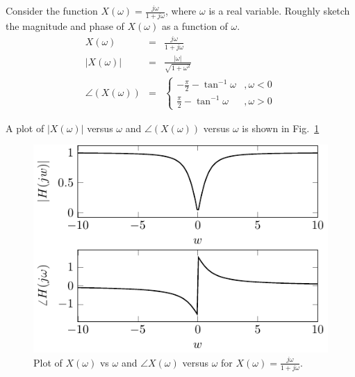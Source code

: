 \begin{example} Consider the function $X(\omega) = \frac{j \omega}{1+j\omega}$, where $\omega$ is a real variable.  Roughly sketch the magnitude and phase of $X(\omega)$ as a function of $\omega$.
\begin{eqnarray}
\nonumber X(\omega) &=& \frac{j\omega}{1+j\omega}\\
\nonumber |X(\omega)| &=& \frac{|\omega|}{\sqrt{1+\omega^2}}\\
\nonumber \angle(X(\omega)) &=& \left\{\begin{array}{ll}
-\frac{\pi}{2}-\tan^{-1}\omega &,\omega <0 \\
\frac{\pi}{2}-\tan^{-1}\omega &,\omega >0\end{array}
\right.
\end{eqnarray}

A plot of $|X(\omega)|$ versus $\omega$ and $\angle(X(\omega))$ versus $\omega$ is shown in Fig.~\ref{fig:Xomegaexample2}
\begin{figure}[htbp]
\begin{center}\includegraphics{../Images/ComplexNumbers/Fig_0_7.pdf}\end{center}
\caption{Plot of $X(\omega)$ vs $\omega$ and $\angle X(\omega)$ versus $\omega$ for $X(\omega) = \frac{j \omega}{1+j\omega}$.}
\label{fig:Xomegaexample2}
\end{figure}
\end{example}

